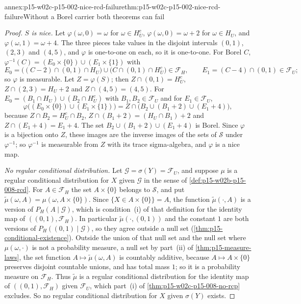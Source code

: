 \begin{annexitem}{annex:p15-w02c-p15-002-nice-rcd-failure}{thm:p15-w02c-p15-002-nice-rcd-failure}{Without a Borel carrier both theorems can fail}
\begin{proof}
\emph{\(S\) is nice.} Let \(\varphi(\omega,0)=\omega\) for
\(\omega\in H_U^c\), \(\varphi(\omega,0)=\omega+2\) for \(\omega\in H_U\),
and \(\varphi(\omega,1)=\omega+4\). The three pieces take values in the
disjoint intervals \((0,1)\), \((2,3)\) and \((4,5)\), and \(\varphi\) is
one-to-one on each, so it is one-to-one. For Borel \(C\),
\(\varphi^{-1}(C)=(E_0\times\{0\})\cup(E_1\times\{1\})\) with
\[
 E_0=\bigl((C-2)\cap(0,1)\cap H_U\bigr)\cup\bigl(C\cap(0,1)\cap H_U^c\bigr)
 \in\mathcal F_H,
 \qquad E_1=(C-4)\cap(0,1)\in\mathcal F_U ;
\]
so \(\varphi\) is measurable. Let \(Z=\varphi(S)\); then
\(Z\cap(0,1)=H_U^c\), \(Z\cap(2,3)=H_U+2\) and \(Z\cap(4,5)=(4,5)\). For
\(E_0=(B_1\cap H_U)\cup(B_2\cap H_U^c)\) with \(B_1,B_2\in\mathcal F_U\) and
for \(E_1\in\mathcal F_U\),
\[
 \varphi\bigl((E_0\times\{0\})\cup(E_1\times\{1\})\bigr)
 =Z\cap\bigl(B_2\cup(B_1+2)\cup(E_1+4)\bigr),
\]
because \(Z\cap B_2=H_U^c\cap B_2\), \(Z\cap(B_1+2)=(H_U\cap B_1)+2\) and
\(Z\cap(E_1+4)=E_1+4\). The set \(B_2\cup(B_1+2)\cup(E_1+4)\) is Borel.
Since \(\varphi\) is a bijection onto \(Z\), these images are the inverse
images of the sets of \(\mathcal S\) under \(\varphi^{-1}\); so
\(\varphi^{-1}\) is measurable from \(Z\) with its trace sigma-algebra,
and \(\varphi\) is a nice map.

\emph{No regular conditional distribution.} Let
\(\mathcal G=\sigma(Y)=\mathcal F_U\), and suppose \(\mu\) is a regular
conditional distribution for \(X\) given \(\mathcal G\) in the sense of
\cref{def:p15-w02b-p15-008-rcd}. For \(A\in\mathcal F_H\) the set
\(A\times\{0\}\) belongs to \(\mathcal S\), and put
\(\tilde\mu(\omega,A)=\mu(\omega,A\times\{0\})\). Since
\(\{X\in A\times\{0\}\}=A\), the function \(\tilde\mu(\cdot,A)\) is a
version of \(P_H(A\mid\mathcal G)\), which is condition~(i) of that
definition for the identity map of \(((0,1),\mathcal F_H)\). In particular
\(\tilde\mu(\cdot,(0,1))\) and the constant \(1\) are both versions of
\(P_H((0,1)\mid\mathcal G)\), so they agree outside a null set
(\cref{thm:p15-conditional-existence}). Outside the union of that null set
and the null set where \(\mu(\omega,\cdot)\) is not a probability measure,
a null set by part~(ii) of \cref{thm:p15-measure-laws}, the set function
\(A\mapsto\tilde\mu(\omega,A)\) is countably additive, because
\(A\mapsto A\times\{0\}\) preserves disjoint countable unions, and has
total mass \(1\); so it is a probability measure on \(\mathcal F_H\). Thus
\(\tilde\mu\) is a regular conditional distribution for the identity map
of \(((0,1),\mathcal F_H)\) given \(\mathcal F_U\), which part~(i) of
\cref{thm:p15-w02c-p15-008-no-rcp} excludes. So no regular conditional
distribution for \(X\) given \(\sigma(Y)\) exists.


\end{proof}
\end{annexitem}
